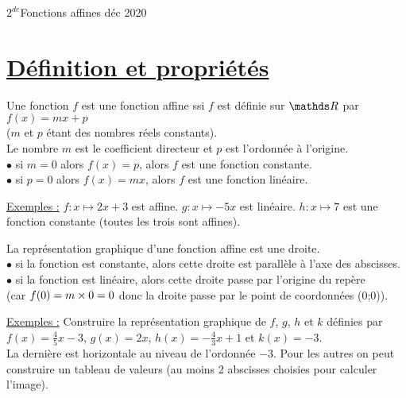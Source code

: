 \documentclass[12 pt,a4paper]{article}
\begin{document}
$2^{de}$\hfill {\LARGE Fonctions affines} \hfill déc 2020
\trait

\section{\underline{Définition et  propriétés}}
\begin{defi}
Une fonction $f$ est une fonction affine ssi $f$ est définie sur $\R$ par $f(x)=mx+p$\medskip\\ ($m$ et $p$ étant des nombres réels constants).\medskip\\
Le nombre $m$ est le coefficient directeur et $p$ est l'ordonnée à l'origine.\medskip\\
$\bullet$ si $m=0$ alors $f(x)=p$, alors $f$ est une fonction constante.\medskip\\
$\bullet$ si $p=0$ alors $f(x)=mx$, alors $f$ est une fonction linéaire.\medskip
\end{defi}

\underline{Exemples :} $f:x\longmapsto 2x+3$ est affine. $g:x \longmapsto -5x$ est linéaire. $h:x\longmapsto7$ est une fonction constante (toutes les trois sont affines).\medskip
\begin{prop}
La représentation graphique d'une fonction affine est une droite.\medskip\\ 
$\bullet$ si la fonction est constante, alors cette droite est parallèle à l'axe des abscisses.\medskip\\
$\bullet$ si la fonction est linéaire, alors cette droite passe par l'origine du repère\medskip\\
(car $f(0)=m\times0=0$ donc la droite passe par le point de coordonnées (0;0)).
\end{prop}

\underline{Exemples :} Construire la représentation graphique de $f$, $g$, $h$ et $k$ définies par $f(x)=\frac{4}{5}x-3$, $g(x)=2x$, $h(x)=-\frac{4}{3}x+1$ et $k(x)=-3$.\medskip\\
La dernière est horizontale au niveau de l'ordonnée $-3$. Pour les autres on peut construire un tableau de valeurs (au moins 2 abscisses choisies pour calculer l'image).

\end{document}
